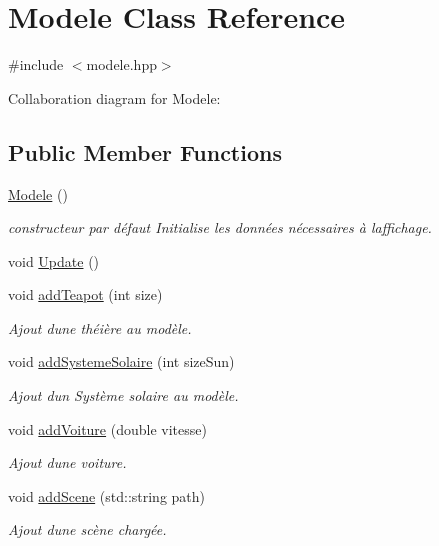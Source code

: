 \hypertarget{class_modele}{}\section{Modele Class Reference}
\label{class_modele}


{\ttfamily \#include $<$modele.\+hpp$>$}



Collaboration diagram for Modele\+:
\subsection*{Public Member Functions}
\begin{DoxyCompactItemize}
\item 
\hyperlink{class_modele_ae9d6a289deaebe7e8eeda46693d79d23}{Modele} ()
\begin{DoxyCompactList}\small\item\em constructeur par défaut Initialise les données nécessaires à l\textquotesingle{}affichage. \end{DoxyCompactList}\item 
void \hyperlink{class_modele_a4e09a90f4eac78fa17d362fe4ff23b2f}{Update} ()
\item 
void \hyperlink{class_modele_a3a5fdb6f258abb35347ba0610eef5ff2}{add\+Teapot} (int size)
\begin{DoxyCompactList}\small\item\em Ajout d\textquotesingle{}une théière au modèle. \end{DoxyCompactList}\item 
void \hyperlink{class_modele_a01924068a9a20616cdfe667caaa0e0e5}{add\+Systeme\+Solaire} (int size\+Sun)
\begin{DoxyCompactList}\small\item\em Ajout d\textquotesingle{}un Système solaire au modèle. \end{DoxyCompactList}\item 
void \hyperlink{class_modele_a9f572a21d86fa69563b9020ddcf7eef9}{add\+Voiture} (double vitesse)
\begin{DoxyCompactList}\small\item\em Ajout d\textquotesingle{}une voiture. \end{DoxyCompactList}\item 
void \hyperlink{class_modele_a2b9ce0869e6965e9247eaa91587d37b7}{add\+Scene} (std\+::string path)
\begin{DoxyCompactList}\small\item\em Ajout d\textquotesingle{}une scène chargée. \end{DoxyCompactList}\item 

\end{DoxyCompactItemize}
